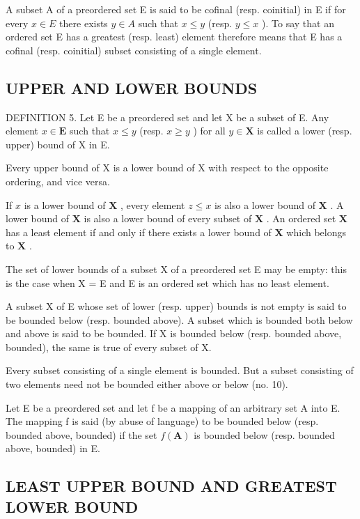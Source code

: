 A subset A of a preordered set E is said to be cofinal (resp. coinitial) in E if for every \(x \in E\) there exists \(y \in A\) such that \(x \leqslant y\) (resp. \(y \leqslant x\) ). To say that an ordered set E has a greatest (resp. least) element therefore means that E has a cofinal (resp. coinitial) subset consisting of a single element.

\subsection{UPPER AND LOWER BOUNDS}

DEFINITION 5. Let E be a preordered set and let X be a subset of E. Any element \(x \in \mathbf{E}\) such that \(x \leqslant y\) (resp. \(x \geqslant y\) ) for all \(y \in \mathbf{X}\) is called a lower (resp. upper) bound of X in E.

Every upper bound of X is a lower bound of X with respect to the opposite ordering, and vice versa.

If \(x\) is a lower bound of \(\mathbf{X}\) , every element \(z \leqslant x\) is also a lower bound of \(\mathbf{X}\) . A lower bound of \(\mathbf{X}\) is also a lower bound of every subset of \(\mathbf{X}\) . An ordered set \(\mathbf{X}\) has a least element if and only if there exists a lower bound of \(\mathbf{X}\) which belongs to \(\mathbf{X}\) .

The set of lower bounds of a subset X of a preordered set E may be empty: this is the case when X = E and E is an ordered set which has no least element.

A subset X of E whose set of lower (resp. upper) bounds is not empty is said to be bounded below (resp. bounded above). A subset which is bounded both below and above is said to be bounded. If X is bounded below (resp. bounded above, bounded), the same is true of every subset of X.

Every subset consisting of a single element is bounded. But a subset consisting of two elements need not be bounded either above or below (no. 10).

Let E be a preordered set and let f be a mapping of an arbitrary set A into E. The mapping f is said (by abuse of language) to be bounded below (resp. bounded above, bounded) if the set \(f(\mathbf{A})\) is bounded below (resp. bounded above, bounded) in E.

\subsection{LEAST UPPER BOUND AND GREATEST LOWER BOUND}


